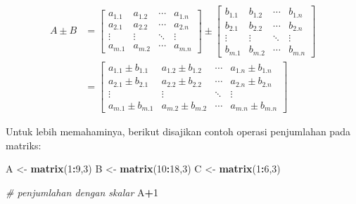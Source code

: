 \documentclass[
]{book}
\newenvironment{Shaded}{\begin{snugshade}}{\end{snugshade}}
\newcommand{\CommentTok}[1]{\textcolor[rgb]{0.56,0.35,0.01}{\textit{#1}}}
\newcommand{\DecValTok}[1]{\textcolor[rgb]{0.00,0.00,0.81}{#1}}
\newcommand{\FunctionTok}[1]{\textcolor[rgb]{0.13,0.29,0.53}{\textbf{#1}}}
\newcommand{\NormalTok}[1]{#1}
\newcommand{\OtherTok}[1]{\textcolor[rgb]{0.56,0.35,0.01}{#1}}
\newcommand{\SpecialCharTok}[1]{\textcolor[rgb]{0.81,0.36,0.00}{\textbf{#1}}}
\theoremstyle{definition}
\theoremstyle{definition}
\theoremstyle{definition}
\theoremstyle{definition}
\theoremstyle{remark}
\begin{document}
\begin{equation}
\begin{split}
A \pm B & = \begin{bmatrix}
       a_{1.1} & a_{1.2} &\cdots& a_{1.n}           \\[0.3em]
       a_{2.1} & a_{2.2} &\cdots& a_{2.n}           \\[0.3em]
       \vdots  & \vdots  &\ddots& \vdots            \\[0.3em]
       a_{m.1} & a_{m.2} &\cdots& a_{m.n}
     \end{bmatrix}
\pm \begin{bmatrix}
      b_{1.1} & b_{1.2} &\cdots& b_{1.n}           \\[0.3em]
      b_{2.1} & b_{2.2} &\cdots& b_{2.n}           \\[0.3em]
      \vdots  & \vdots  &\ddots& \vdots            \\[0.3em]
      b_{m.1} & b_{m.2} &\cdots& b_{m.n}
     \end{bmatrix} \\
& = \begin{bmatrix}
       a_{1.1}\pm b_{1.1} & a_{1.2}\pm b_{1.2} &\cdots& a_{1.n}\pm b_{1.n}           \\[0.3em]
       a_{2.1}\pm b_{2.1} & a_{2.2}\pm b_{2.2} &\cdots& a_{2.n}\pm b_{2.n}           \\[0.3em]
       \vdots  & \vdots  &\ddots& \vdots            \\[0.3em]
       a_{m.1}\pm b_{m.1} & a_{m.2}\pm b_{m.2} &\cdots& a_{m.n}\pm b_{m.n}
     \end{bmatrix}
\end{split}
  \label{eq:addmatrik2}
\end{equation}

Untuk lebih memahaminya, berikut disajikan contoh operasi penjumlahan pada matriks:

\begin{Shaded}
\begin{Highlighting}[]
\NormalTok{A }\OtherTok{\textless{}{-}} \FunctionTok{matrix}\NormalTok{(}\DecValTok{1}\SpecialCharTok{:}\DecValTok{9}\NormalTok{,}\DecValTok{3}\NormalTok{)}
\NormalTok{B }\OtherTok{\textless{}{-}} \FunctionTok{matrix}\NormalTok{(}\DecValTok{10}\SpecialCharTok{:}\DecValTok{18}\NormalTok{,}\DecValTok{3}\NormalTok{)}
\NormalTok{C }\OtherTok{\textless{}{-}} \FunctionTok{matrix}\NormalTok{(}\DecValTok{1}\SpecialCharTok{:}\DecValTok{6}\NormalTok{,}\DecValTok{3}\NormalTok{)}

\CommentTok{\# penjumlahan dengan skalar}
\NormalTok{A}\SpecialCharTok{+}\DecValTok{1}
\end{Highlighting}
\end{Shaded}
\end{document}
